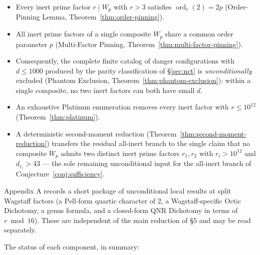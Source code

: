 \documentclass[12pt]{article}
\theoremstyle{plain}
\theoremstyle{definition}
\theoremstyle{remark}
\begin{document}
\begin{itemize}
\item Every inert prime factor \(r \mid W_p\) with \(r > 3\) satisfies
  \(\operatorname{ord}_r(2) = 2p\) (Order-Pinning Lemma,
  Theorem~\ref{thm:order-pinning}).
\item All inert prime factors of a single composite \(W_p\) share a
  common order parameter \(p\) (Multi-Factor Pinning,
  Theorem~\ref{thm:multi-factor-pinning}).
\item Consequently, the complete finite catalog of danger
  configurations with \(d \leq 1000\) produced by the parity
  classification of \S\ref{sec:nct} is \emph{unconditionally}
  excluded (Phantom Exclusion,
  Theorem~\ref{thm:phantom-exclusion}): within a single composite, no
  two inert factors can both have small \(d\).
\item An exhaustive Platinum enumeration removes every inert factor
  with \(r \leq 10^{12}\) (Theorem~\ref{thm:platinum}).
\item A deterministic second-moment reduction
  (Theorem~\ref{thm:second-moment-reduction}) transfers the
  residual all-inert branch to the single claim that no composite
  \(W_p\) admits two distinct inert prime factors \(r_1, r_2\)
  with \(r_i > 10^{12}\) and \(d_{r_i} > 43\) --- the sole
  remaining unconditional input for the all-inert branch of
  Conjecture~\ref{conj:sufficiency}.
\end{itemize}

Appendix A records a short package of unconditional local results
at split Wagstaff factors (a Pell-form quartic character of 2,
a Wagstaff-specific Octic Dichotomy, a genus formula, and a
closed-form QNR Dichotomy in terms of \(r \bmod 16\)). These are
independent of the main reduction of \S5 and may be read
separately.

The status of each component, in summary:
\end{document}
